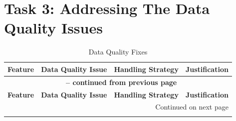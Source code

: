 \documentclass[11pt]{article}
\begin{document}
\section*{Task 3: Addressing The Data Quality Issues}
\begin{longtable}{|p{1.7cm}|l|p{3cm}|p{6cm}|}
	\caption{Data Quality Fixes} \label{tab:feature_quality_fixes} \\
	\hline
	\textbf{Feature} & \textbf{Data Quality Issue} & \textbf{Handling Strategy} & \textbf{Justification} \\
	\hline
	\endfirsthead
	
	\multicolumn{4}{c}{{\bfseries \tablename\ \thetable{} -- continued from previous page}} \\
	\hline
	\textbf{Feature} & \textbf{Data Quality Issue} & \textbf{Handling Strategy} & \textbf{Justification} \\
	\hline
	\endhead
	
	\hline \multicolumn{4}{r}{{Continued on next page}} \\
	\endfoot
	

\end{longtable}
\end{document}

